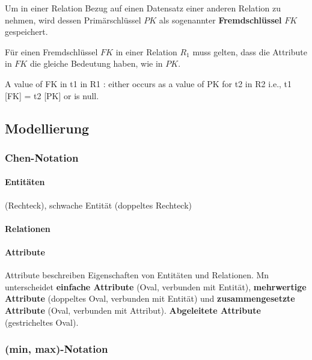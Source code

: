 Um in einer Relation Bezug auf einen Datensatz einer anderen Relation zu nehmen,
wird dessen Primärschlüssel $PK$ als sogenannter \textbf{Fremdschlüssel} $FK$ gespeichert.

Für einen Fremdschlüssel $FK$ in einer Relation $R_1$ muss gelten,
dass die Attribute in $FK$ die gleiche Bedeutung haben, wie in $PK$.

A value of FK in t1 in R1 :
either occurs as a value of PK for t2 in R2
i.e., t1 [FK] = t2 [PK]
or is null.


%
%
\subsection{Modellierung}

\subsubsection{Chen-Notation}

\paragraph{Entitäten}

(Rechteck),
schwache Entität (doppeltes Rechteck)

\paragraph{Relationen}

\paragraph{Attribute}

Attribute beschreiben Eigenschaften von Entitäten und Relationen.
Mn unterscheidet \textbf{einfache Attribute} (Oval, verbunden mit Entität),
\textbf{mehrwertige Attribute} (doppeltes Oval, verbunden mit Entität) und
\textbf{zusammengesetzte Attribute} (Oval, verbunden mit Attribut).
\textbf{Abgeleitete Attribute} (gestricheltes Oval).

\paragraph{}

\subsubsection{(min, max)-Notation}

